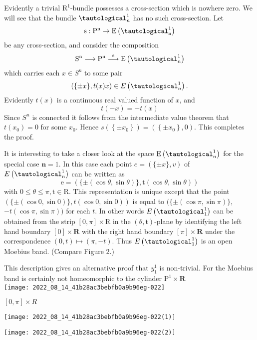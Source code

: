 \documentclass[10pt]{article}
\begin{document}
Evidently a trivial $\mathrm{R}^{1}$-bundle possesses a cross-section which is nowhere zero. We will see that the bundle $\tautological_{n}^{1}$ has no such cross-section. Let
$$
\mathrm{s}: \mathrm{P}^{\mathrm{n}} \rightarrow \mathrm{E}\left(\tautological_{\mathrm{n}}^{1}\right)
$$
be any cross-section, and consider the composition
$$
\mathrm{S}^{\mathrm{n}} \longrightarrow \mathrm{P}^{\mathrm{n}} \stackrel{\mathrm{s}}{\longrightarrow} \mathrm{E}\left(\tautological_{n}^{1}\right)
$$
which carries each $x \in S^{n}$ to some pair
$$
(\{\pm x\}, t(x) x) \in E\left(\tautological_{n}^{1}\right) .
$$
Evidently $t(x)$ is a continuous real valued function of $x$, and
$$
t(-x)=-t(x)
$$
Since $S^{n}$ is connected it follows from the intermediate value theorem that $t\left(x_{0}\right)=0$ for some $x_{0}$. Hence $s\left(\left\{\pm x_{0}\right\}\right)=\left(\left\{\pm x_{0}\right\}, 0\right)$. This completes the proof.

It is interesting to take a closer look at the space $\mathrm{E}\left(\tautological_{n}^{1}\right)$ for the special case $\mathbf{n}=1$. In this case each point $e=(\{\pm x\}, v)$ of $E\left(\tautological_{n}^{1}\right)$ can be written as
$$
\mathrm{e}=(\{\pm(\cos \theta, \sin \theta)\}, \mathrm{t}(\cos \theta, \sin \theta))
$$
with $0 \leq \theta \leq \pi, \mathrm{t} \in \mathrm{R}$. This representation is unique except that the point $(\{\pm(\cos 0, \sin 0)\}, t(\cos 0, \sin 0))$ is equal to $(\{\pm(\cos \pi, \sin \pi)\}$, $-t(\cos \pi, \sin \pi))$ for each $t$. In other words $E\left(\tautological_{1}^{1}\right)$ can be obtained from the strip $[0, \pi] \times \mathrm{R}$ in the $(\theta, \mathrm{t})$-plane by identifying the left hand boundary $[0] \times \mathbf{R}$ with the right hand boundary $[\pi] \times \mathbf{R}$ under the correspondence $(0, t) \mapsto(\pi,-t)$. Thus $E\left(\tautological_{1}^{1}\right)$ is an open Moebius band. (Compare Figure 2.)

This description gives an alternative proof that $y_{1}^{1}$ is non-trivial. For the Moebius band is certainly not homeomorphic to the cylinder $\mathrm{P}^{1} \times \mathbf{R}$\\

\texttt{[image: 2022\_08\_14\_41b28ac3bebfb0a9b96eg-022]}

$[0, \pi] \times R$

\texttt{[image: 2022\_08\_14\_41b28ac3bebfb0a9b96eg-022(1)]}

\texttt{[image: 2022\_08\_14\_41b28ac3bebfb0a9b96eg-022(2)]}
\end{document}
